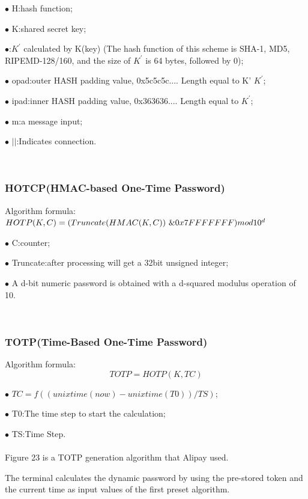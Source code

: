 \documentclass[journal]{IEEEtran}
\begin{document}
$\bullet$ H:hash function;

$\bullet$ K:shared secret key;

$\bullet$:$K^{\prime}$ calculated by K(key) (The hash function of this scheme is SHA-1, MD5, RIPEMD-128/160, and the size of $K^{\prime}$ is 64 bytes, followed by 0);


$\bullet$ opad:outer HASH padding value, 0x5c5c5c.... Length equal to K’ $K^{\prime}$;

$\bullet$ ipad:inner HASH padding value, 0x363636.... Length equal to  $K^{\prime}$;

$\bullet$ m:a message input;

$\bullet$ $||$:Indicates connection.

\

\subsubsection{HOTCP(HMAC-based One-Time Password)}
Algorithm formula:
\\
$HOTP(K,C) = (Truncate(HMAC(K,C)) ~\& 
\\0x7FFFFFFF)mod 10^{d}$

$\bullet$ C:counter;

$\bullet$ Truncate:after processing will get a 32bit unsigned integer;

$\bullet$ A d-bit numeric password is obtained with a d-squared modulus operation of 10.

\

\subsubsection{TOTP(Time-Based One-Time Password)}


Algorithm formula:
\\
$$TOTP = HOTP(K, TC)$$

$\bullet$ $TC=f((unixtime(now)-unixtime(T0)) / TS)$;

$\bullet$ T0:The time step to start the calculation;

$\bullet$ TS:Time Step.
\\
\\





Figure 23 is a TOTP generation algorithm that Alipay used.

The terminal calculates the dynamic password by using the pre-stored token and the current time as input values of the first preset algorithm.
\end{document}
